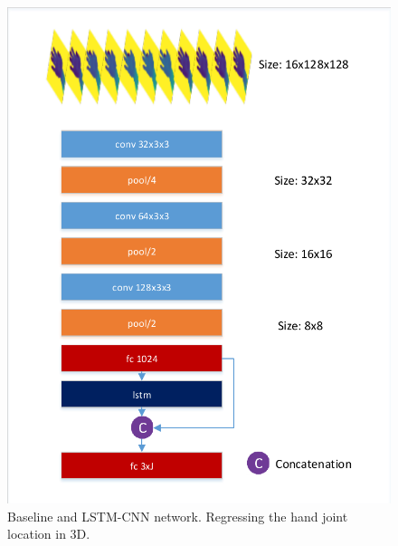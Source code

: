 \documentclass[journal,comsoc]{IEEEtran}
\let\MYoriglatexcaption\caption
\renewcommand{\caption}[2][\relax]{\MYoriglatexcaption[#2]{#2}}
\begin{document}
\begin{figure}[t]
{\begin{minipage}[t]{240pt}
            \includegraphics[width=1\linewidth]{src/network/lstm.pdf}
        \end{minipage}
    }
\caption{Baseline and LSTM-CNN network. Regressing the hand joint location in 3D.}
\label{fig:baseline and lstm network}
\end{figure}
\end{document}
